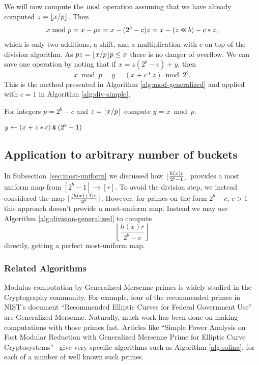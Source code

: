 We will now compute the $\bmod$ operation assuming that
we have already computed $z=\lfloor {x/p} \rfloor$. Then
\begin{align}
   x \bmod p
   = x - pz
   = x - (2^b-c)z
   = x - (z\mathbin{\texttt{<\!<}} b) - c*z,
\end{align}
which is only two additions, a shift, and a multiplication with $c$ on top of the division algorithm.
As $pz = \lfloor {x/p} \rfloor p \le x$ there is no danger of overflow.
We can save one operation by noting
that if $x = z (2^b-c) + y$, then
$$x\bmod p = y=\left(x+c*z \right) \bmod 2^b.$$
This is the method presented in Algorithm \ref{alg:mod-generalized} and applied with $c=1$ in Algorithm \ref{alg:div-simple}.
\begin{algorithm}[H]
   \caption{For integers $p=2^b-c$ and $z=\lfloor {x/p} \rfloor$ compute
      $y=x \bmod p$.}
   \label{alg:mod-generalized}
   \begin{algorithmic}
      \State $y \gets (x + z*c) \mathbin{\texttt{\&}} (2^b-1)$
   \end{algorithmic}
\end{algorithm}




\subsection{Application to arbitrary number of buckets}\label{sec:pseudo-arbitrary}
In Subsection~\ref{sec:most-uniform} we discussed how $\lfloor {\frac{h(x)r}{2^b-1}} \rfloor$ provides a most uniform map from $[2^b-1]\to[r]$.
To avoid the division step, we instead considered the map
$\lfloor {\frac{(h(x)+1)r}{2^b}} \rfloor$.
However, for primes on the form $2^b-c$, $c>1$ this approach doesn't provide a most-uniform map.
%
Instead we may use Algorithm \ref{alg:division-generalized} to compute
$$\left\lfloor\frac{h(x)r}{2^b-c}\right\rfloor$$
directly, getting a perfect most-uniform map.


\subsubsection{Related Algorithms}

Modulus computation by Generalized Mersenne primes is widely studied in the Cryptography community.
For example, four of the recommended primes in NIST's document ``Recommended Elliptic Curves for Federal Government Use'' are Generalized Mersenne.
Naturally, much work has been done on making computations with those primes fast.
Articles like ``Simple Power Analysis on Fast Modular Reduction with Generalized Mersenne Prime for Elliptic Curve Cryptosystems''~\cite{sakai2006simple}
give very specific algorithms such as Algorithm \ref{alg:solina}, for each of a number of well known such primes.

